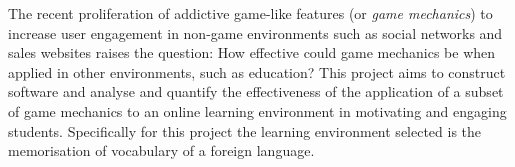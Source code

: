 The recent proliferation of addictive game-like features (or \textit{game mechanics}) to 
increase user engagement in non-game environments such as social networks and 
sales websites raises the question: 
How effective could game mechanics be when applied in other environments, such as 
education? This project aims to construct software and analyse and quantify the
effectiveness of the application of a subset of game mechanics to an online 
learning environment in motivating and engaging students. Specifically for 
this project the learning environment selected is the memorisation of vocabulary 
of a foreign language.
